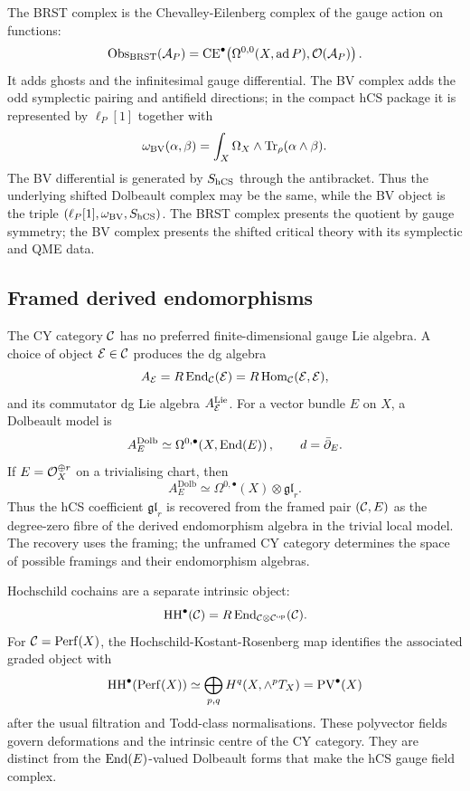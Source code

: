 The BRST complex is the Chevalley-Eilenberg complex of the gauge action
on functions:
\[
  \operatorname{Obs}_{\operatorname{BRST}}(\mathcal{A}_P)
  =
  \operatorname{CE}^\bullet\!\left(
    \Omega^{0,0}(X,\operatorname{ad}P),
    \mathcal{O}(\mathcal{A}_P)
  \right).
\]
It adds ghosts and the infinitesimal gauge differential. The BV complex
adds the odd symplectic pairing and antifield directions; in the compact
hCS package it is represented by \(\ell_P[1]\) together with
\[
  \omega_{\operatorname{BV}}(\alpha,\beta)
  =
  \int_X \Omega_X\wedge\operatorname{Tr}_\rho(\alpha\wedge\beta).
\]
The BV differential is generated by \(S_{\mathrm{hCS}}\) through the
antibracket. Thus the underlying shifted Dolbeault complex may be the
same, while the BV object is the triple
\((\ell_P[1],\omega_{\operatorname{BV}},S_{\mathrm{hCS}})\). The BRST complex presents the
quotient by gauge symmetry; the BV complex presents the shifted
critical theory with its symplectic and QME data.

\subsection*{Framed derived endomorphisms}

The CY category \(\mathcal{C}\) has no preferred finite-dimensional gauge Lie
algebra. A choice of object \(\mathcal{E}\in\mathcal{C}\) produces the dg algebra
\[
  A_{\mathcal{E}}
  =
  R\operatorname{End}_{\mathcal{C}}(\mathcal{E})
  =
  R\operatorname{Hom}_{\mathcal{C}}(\mathcal{E},\mathcal{E}),
\]
and its commutator dg Lie algebra \(A_{\mathcal{E}}^{\mathrm{Lie}}\). For a
vector bundle \(E\) on \(X\), a Dolbeault model is
\[
  A_E^{\mathrm{Dolb}}
  \simeq
  \Omega^{0,\bullet}\!\left(X,\operatorname{End}(E)\right),
  \qquad
  d=\bar\partial_E .
\]
If \(E=\mathcal{O}_X^{\oplus r}\) on a trivialising chart, then
\[
  A_E^{\mathrm{Dolb}}
  \simeq
  \Omega^{0,\bullet}(X)\otimes\mathfrak{gl}_r .
\]
Thus the hCS coefficient \(\mathfrak{gl}_r\) is recovered from the
framed pair \((\mathcal{C},E)\) as the degree-zero fibre of the derived
endomorphism algebra in the trivial local model. The recovery uses the
framing; the unframed CY category determines the space of possible
framings and their endomorphism algebras.

Hochschild cochains are a separate intrinsic object:
\[
  \operatorname{HH}^\bullet(\mathcal{C})
  =
  R\operatorname{End}_{\mathcal{C}\otimes\mathcal{C}^{\mathrm{op}}}(\mathcal{C}).
\]
For \(\mathcal{C}=\mathrm{Perf}(X)\), the Hochschild-Kostant-Rosenberg map identifies
the associated graded object with
\[
  \operatorname{HH}^\bullet(\mathrm{Perf}(X))
  \simeq
  \bigoplus_{p,q} H^q(X,\wedge^p T_X)
  =
  \operatorname{PV}^\bullet(X)
\]
after the usual filtration and Todd-class normalisations. These
polyvector fields govern deformations and the intrinsic centre of the
CY category. They are distinct from the \(\operatorname{End}(E)\)-valued Dolbeault
forms that make the hCS gauge field complex.

